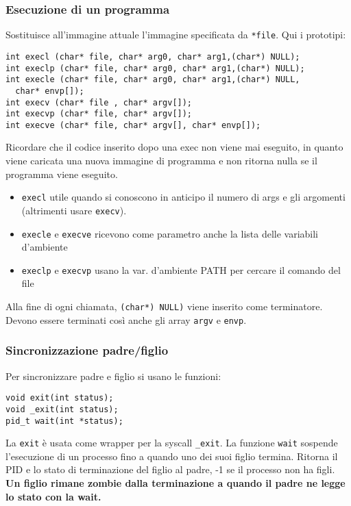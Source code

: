 \documentclass[a4paper, 10pt]{article}
\begin{document}
\subsubsection{Esecuzione di un programma}
Sostituisce all'immagine attuale l'immagine specificata da \verb|*file|. Qui i prototipi:
\begin{verbatim}
int execl (char* file, char* arg0, char* arg1,(char*) NULL);
int execlp (char* file, char* arg0, char* arg1,(char*) NULL);
int execle (char* file, char* arg0, char* arg1,(char*) NULL, 
  char* envp[]);
int execv (char* file , char* argv[]);
int execvp (char* file, char* argv[]);
int execve (char* file, char* argv[], char* envp[]);
\end{verbatim}
Ricordare che il codice inserito dopo una exec non viene mai eseguito, in quanto viene caricata una nuova immagine di programma e non ritorna nulla se il programma viene eseguito.
\begin{itemize}
\item \verb|execl| utile quando si conoscono in anticipo il numero di args e gli argomenti (altrimenti usare \verb|execv|).
\item \verb|execle| e \verb|execve| ricevono come parametro anche la lista delle variabili d'ambiente
\item \verb|execlp| e \verb|execvp| usano la var. d'ambiente PATH  per cercare il comando del file
\end{itemize}
Alla fine di ogni chiamata, \verb|(char*) NULL)| viene inserito come terminatore. Devono essere terminati così anche gli array \verb|argv| e \verb|envp|.

\subsubsection{Sincronizzazione padre/figlio}
Per sincronizzare padre e figlio si usano le funzioni:
\begin{verbatim}
void exit(int status);
void _exit(int status);
pid_t wait(int *status);
\end{verbatim}

La \verb|exit| è usata come wrapper per la syscall \verb|_exit|.
La funzione \verb|wait| sospende l'esecuzione di un processo fino a quando uno dei suoi figlio termina. Ritorna il PID e lo stato di terminazione del figlio al padre, -1 se il processo non ha figli. \\

\textbf{Un figlio rimane zombie dalla terminazione a quando il padre ne legge lo stato con la wait.} \\
\end{document}
